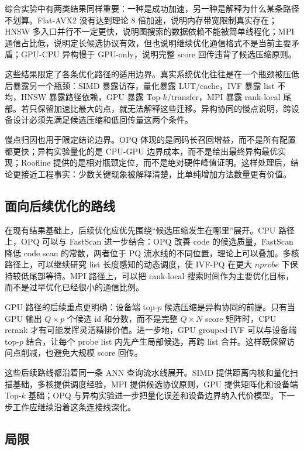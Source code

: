 \documentclass[a4paper,11pt,UTF8]{ctexart}
\begin{document}
综合实验中有两类结果同样重要：一种是成功加速，另一种是解释为什么某条路径不划算。Flat-AVX2 没有达到理论 8 倍加速，说明内存带宽限制真实存在；HNSW 多入口并行不一定更快，说明图搜索的数据依赖不能被简单线程化；MPI 通信占比低，说明定长候选协议有效，但也说明继续优化通信格式不是当前主要矛盾；GPU-CPU 异构慢于 GPU-only，说明完整 score 回传违背了候选压缩原则。

这些结果限定了各条优化路径的适用边界。真实系统优化往往是在一个瓶颈被压低后暴露另一个瓶颈：SIMD 暴露访存，量化暴露 LUT/cache，IVF 暴露 list 不均，HNSW 暴露路径依赖，GPU 暴露 Top-$k$/transfer，MPI 暴露 rank-local 尾部。若只保留加速比最大的点，就无法解释这些迁移。异构协同的慢点说明，跨设备设计必须先满足候选压缩和低回传量这两个条件。

慢点归因也用于限定结论边界。OPQ 体现的是同码长召回增益，而不是所有配置都更快；异构实验量化的是 CPU-GPU 边界成本，而不是给出最终异构最优实现；Roofline 提供的是相对瓶颈定位，而不是绝对硬件峰值证明。这样处理后，结论更接近工程事实：少数关键现象被解释清楚，比单纯增加方法数量更有价值。

\subsection{面向后续优化的路线}

在现有结果基础上，后续优化应优先围绕“候选压缩发生在哪里”展开。CPU 路径上，OPQ 可以与 FastScan 进一步结合：OPQ 改善 code 的候选质量，FastScan 降低 code scan 的常数，两者位于 PQ 流水线的不同位置，理论上可以叠加。多核路径上，可以继续研究 list 长度感知的动态调度，使 IVF-PQ 在更大 $nprobe$ 下保持较低尾部等待。MPI 路径上，可以把 rank-local 搜索时间作为主要优化目标，而不是过早优化已经很小的通信比例。

GPU 路径的后续重点更明确：设备端 top-$p$ 候选压缩是异构协同的前提。只有当 GPU 输出 $Q\times p$ 个候选 id 和分数，而不是完整 $Q\times N$ score 矩阵时，CPU rerank 才有可能发挥灵活精排价值。进一步地，GPU grouped-IVF 可以与设备端 top-$p$ 结合，让每个 probe list 内先产生局部候选，再跨 list 合并。这样既保留访问点削减，也避免大规模 score 回传。

这些后续路线都沿着同一条 ANN 查询流水线展开。SIMD 提供距离内核和量化扫描基础，多核提供调度经验，MPI 提供候选协议原则，GPU 提供矩阵化和设备端 Top-$k$ 基础；OPQ 与异构实验进一步把量化误差和设备边界纳入代价模型。下一步工作应继续沿着这条连接线深化。


\subsection{局限}
\end{document}
